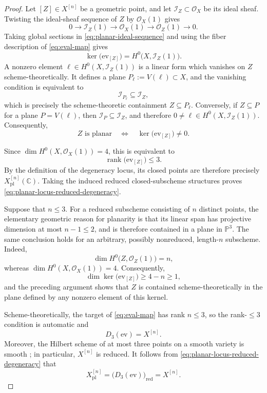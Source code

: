 \documentclass[12pt]{amsart}
\numberwithin{equation}{section}
\newcommand{\PP}{\mathbb{P}}
\newcommand{\C}{\mathbb{C}}
\newcommand{\OO}{\mathcal{O}}
\newcommand{\I}{\mathcal{I}}
\theoremstyle{plain}
\theoremstyle{definition}
\theoremstyle{remark}
\begin{document}
\begin{proof}
Let $[Z]\in X^{[n]}$ be a geometric point, and let $\I_Z\subset\OO_X$ be its ideal sheaf.
Twisting the ideal-sheaf sequence of $Z$ by $\OO_X(1)$ gives
\begin{equation}\label{eq:planar-ideal-sequence}
0\longrightarrow \I_Z(1)
\longrightarrow \OO_X(1)
\longrightarrow \OO_Z(1)
\longrightarrow 0.
\end{equation}
Taking global sections in \eqref{eq:planar-ideal-sequence} and using the fiber description of \eqref{eq:eval-map} gives
\[
\ker\bigl(\mathrm{ev}_{[Z]}\bigr)=H^0\bigl(X,\I_Z(1)\bigr).
\]
A nonzero element $\ell\in H^0(X,\I_Z(1))$ is a linear form which vanishes on $Z$ scheme-theoretically.
It defines a plane $P_\ell:=V(\ell)\subset X$, and the vanishing condition is equivalent to
\[
\I_{P_\ell}\subseteq \I_Z,
\]
which is precisely the scheme-theoretic containment $Z\subseteq P_\ell$.
Conversely, if $Z\subseteq P$ for a plane $P=V(\ell)$, then $\I_P\subseteq\I_Z$, and therefore $0\neq\ell\in H^0(X,\I_Z(1))$.
Consequently,
\[
Z\text{ is planar}
\quad\Longleftrightarrow\quad
\ker\bigl(\mathrm{ev}_{[Z]}\bigr)\neq 0.
\]

Since $\dim H^0(X,\OO_X(1))=4$, this is equivalent to
\[
\operatorname{rank}\bigl(\mathrm{ev}_{[Z]}\bigr)\leq 3.
\]
By the definition of the degeneracy locus, its closed points are therefore precisely $X^{[n]}_{\mathrm{pl}}(\C)$.
Taking the induced reduced closed-subscheme structures proves \eqref{eq:planar-locus-reduced-degeneracy}.

Suppose that $n\leq 3$.
For a reduced subscheme consisting of $n$ distinct points, the elementary geometric reason for planarity is that its linear span has projective dimension at most $n-1\leq 2$, and is therefore contained in a plane in $\PP^3$.
The same conclusion holds for an arbitrary, possibly nonreduced, length-$n$ subscheme.
Indeed,
\[
\dim H^0\bigl(Z,\OO_Z(1)\bigr)=n,
\]
whereas $\dim H^0(X,\OO_X(1))=4$.
Consequently,
\[
\dim\ker\bigl(\mathrm{ev}_{[Z]}\bigr)\geq 4-n\geq 1,
\]
and the preceding argument shows that $Z$ is contained scheme-theoretically in the plane defined by any nonzero element of this kernel.

Scheme-theoretically, the target of \eqref{eq:eval-map} has rank $n\leq3$, so the rank-$\leq3$ condition is automatic and
\[
D_3(\mathrm{ev})=X^{[n]}.
\]
Moreover, the Hilbert scheme of at most three points on a smooth variety is smooth \cite[\S~7.2]{FGlocal}; in particular, $X^{[n]}$ is reduced.
It follows from \eqref{eq:planar-locus-reduced-degeneracy} that
\[
X^{[n]}_{\mathrm{pl}}
=\bigl(D_3(\mathrm{ev})\bigr)_{\mathrm{red}}
=X^{[n]}.
\]


\end{proof}
\end{document}
